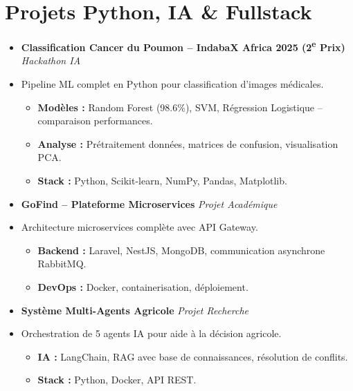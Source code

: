 \documentclass[a4paper,11pt]{article}
\begin{document}
\section{Projets Python, IA \& Fullstack}
\begin{itemize}[leftmargin=*, label={}]

\item \textbf{Classification Cancer du Poumon -- IndabaX Africa 2025 (2\textsuperscript{e} Prix)} \hfill \textit{Hackathon IA}
\vspace{-2pt}
\item \small{Pipeline ML complet en Python pour classification d'images médicales.}
    \begin{itemize}[leftmargin=0.4cm, nosep, label=\tiny$\bullet$]
        \item \small{\textbf{Modèles :} Random Forest (98.6\%), SVM, Régression Logistique -- comparaison performances.}
        \item \small{\textbf{Analyse :} Prétraitement données, matrices de confusion, visualisation PCA.}
        \item \small{\textbf{Stack :} Python, Scikit-learn, NumPy, Pandas, Matplotlib.}
    \end{itemize}
    \vspace{3pt}

\item \textbf{GoFind -- Plateforme Microservices} \hfill \textit{Projet Académique}
\vspace{-2pt}
\item \small{Architecture microservices complète avec API Gateway.}
    \begin{itemize}[leftmargin=0.4cm, nosep, label=\tiny$\bullet$]
        \item \small{\textbf{Backend :} Laravel, NestJS, MongoDB, communication asynchrone RabbitMQ.}
        \item \small{\textbf{DevOps :} Docker, containerisation, déploiement.}
    \end{itemize}
    \vspace{3pt}

\item \textbf{Système Multi-Agents Agricole} \hfill \textit{Projet Recherche}
\vspace{-2pt}
\item \small{Orchestration de 5 agents IA pour aide à la décision agricole.}
    \begin{itemize}[leftmargin=0.4cm, nosep, label=\tiny$\bullet$]
        \item \small{\textbf{IA :} LangChain, RAG avec base de connaissances, résolution de conflits.}
        \item \small{\textbf{Stack :} Python, Docker, API REST.}
    \end{itemize}
    \vspace{3pt}


\end{itemize}
\end{document}

